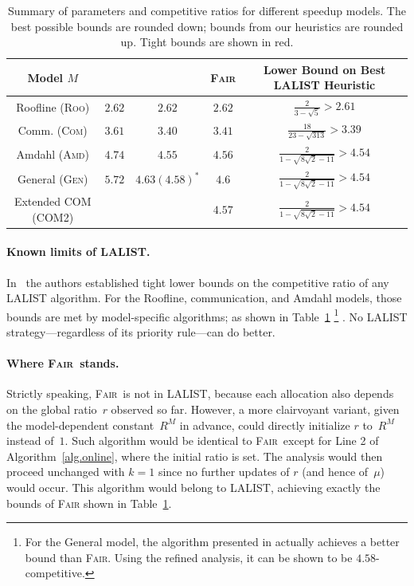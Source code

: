 \documentclass{article}
\newcommand\fair{\textsc{Fair}\xspace}
\newcommand\ratio{R\xspace}
\newcommand\rratio{r\xspace}
\newcommand\ROO{\textsc{Roo}\xspace}
\newcommand\COM{\textsc{Com}\xspace}
\newcommand\AMD{\textsc{Amd}\xspace}
\newcommand\GEN{\textsc{Gen}\xspace}
\begin{document}
\renewcommand{\arraystretch}{1.7}
\begin{table}[h]
\centering
\caption{Summary of parameters and competitive ratios for different speedup models. The best possible bounds are rounded down; bounds from our heuristics are rounded up. Tight bounds are shown in red. }
\label{tab.all-valuesmain}
\begin{tabular}{| c | c | c | c | c |}
\hline
\textbf{Model $M$} & \cite{ICPP22} & \cite{TOPC24} & \fair & Lower Bound on Best \textsc{LALIST} Heuristic \\
\hline
Roofline (\ROO) & {\color{red} $2.62$} & {\color{red} $2.62$} & {\color{red} $2.62$} & $\frac{2}{3-\sqrt{5}} > 2.61$ \\
\hline
Comm. (\COM) & $3.61$ & {\color{red} $3.40$} & $3.41$ & $\frac{18}{23-\sqrt{313}} > 3.39$ \\
\hline
Amdahl (\AMD) & $4.74$ & {\color{red} $4.55$} & $4.56$ & $\frac{2}{1-\sqrt{8\sqrt{2}-11}} > 4.54$ \\
\hline
General (\GEN) & $5.72$ & $4.63 (4.58)^*$ & $4.6$ & $\frac{2}{1-\sqrt{8\sqrt{2}-11}} > 4.54$ \\
\hline
Extended COM (COM2) &  &   & $4.57$ & $\frac{2}{1-\sqrt{8\sqrt{2}-11}} > 4.54$  \\
\hline
\end{tabular}
\end{table}



\paragraph{Known limits of \textsc{LALIST}.}
In~\cite{TOPC24} the authors established tight lower bounds on the competitive ratio of any \textsc{LALIST} algorithm.  
For the Roofline, communication, and Amdahl models, those bounds are met by model-specific algorithms; as shown in Table~\ref{tab.all-valuesmain} \footnote{For the General model, the algorithm presented in \cite{TOPC24} actually achieves a better bound than \fair. Using the refined analysis, it can be shown to be $4.58$-competitive. } .  
No \textsc{LALIST} strategy—regardless of its priority rule—can do better.



\paragraph{Where \fair\ stands.}
Strictly speaking, \fair\ is not in \textsc{LALIST}, because each allocation also depends on the global ratio~$\rratio$ observed so far.  
However, a more clairvoyant variant, given the model-dependent constant~$\ratio^M$ in advance, could directly initialize $\rratio$ to~$\ratio^M$ instead of~$1$. Such algorithm would be identical to \fair\ except for Line 2 of Algorithm~\ref{alg.online}, where the initial ratio is set.
The analysis would then proceed unchanged with $k=1$ since no further updates of $\rratio$ (and hence of~$\mu$) would occur. This algorithm would belong to \textsc{LALIST}, achieving exactly the bounds of \fair shown in Table~\ref{tab.all-valuesmain}.
\end{document}
